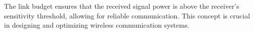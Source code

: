 The link budget ensures that the received signal power is above the receiver's sensitivity threshold, allowing for reliable communication. This concept is crucial in designing and optimizing wireless communication systems.

